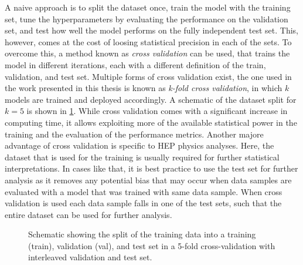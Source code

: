 A naive approach is to split the dataset once, train the model with the training set, tune the hyperparameters by evaluating the performance on the validation set, and test how well the model performs on the fully independent test set. 
This, however, comes at the cost of loosing statistical precision in each of the sets. 
To overcome this, a method known as \emph{cross validation} can be used, that trains the model in different iterations, each with a different definition of the train, validation, and test set.
Multiple forms of cross validation exist, the one used in the work presented in this thesis is known as \emph{k-fold cross validation}, in which $k$ models are trained and deployed accordingly. A schematic of the dataset split for $k=5$ is shown in \cref{fig:k-fold-method}. 
While cross validation comes with a significant increase in computing time, it allows exploiting more of the available statistical power in the training and the evaluation of the performance metrics.
Another majore advantage of cross validation is specific to HEP physics analyses. 
Here, the dataset that is used for the training is usually required for further statistical interpretations. In cases like that, it is best practice to use the test set for further analysis as it removes any potential bias that may occur when data samples are evaluated with a model that was trained with same data sample.
When cross validation is used each data sample falls in one of the test sets, such that the entire dataset can be used for further analysis.

\begin{figure}[t]
    \caption{Schematic showing the split of the training data into a training (train), validation (val), and test set in a 5-fold cross-validation with interleaved validation and test set.}
    \label{fig:k-fold-method}
\end{figure}
